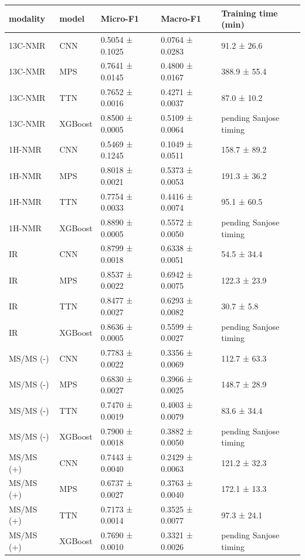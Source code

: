 \begin{tabular}{lllll}
\toprule
modality & model & Micro-F1 & Macro-F1 & Training time (min) \\
\midrule
13C-NMR & CNN & 0.5054 ± 0.1025 & 0.0764 ± 0.0283 & 91.2 ± 26.6 \\
13C-NMR & MPS & 0.7641 ± 0.0145 & 0.4800 ± 0.0167 & 388.9 ± 55.4 \\
13C-NMR & TTN & 0.7652 ± 0.0016 & 0.4271 ± 0.0037 & 87.0 ± 10.2 \\
13C-NMR & XGBoost & 0.8500 ± 0.0005 & 0.5109 ± 0.0064 & pending Sanjose timing \\
1H-NMR & CNN & 0.5469 ± 0.1245 & 0.1049 ± 0.0511 & 158.7 ± 89.2 \\
1H-NMR & MPS & 0.8018 ± 0.0021 & 0.5373 ± 0.0053 & 191.3 ± 36.2 \\
1H-NMR & TTN & 0.7754 ± 0.0033 & 0.4416 ± 0.0074 & 95.1 ± 60.5 \\
1H-NMR & XGBoost & 0.8890 ± 0.0005 & 0.5572 ± 0.0050 & pending Sanjose timing \\
IR & CNN & 0.8799 ± 0.0018 & 0.6338 ± 0.0051 & 54.5 ± 34.4 \\
IR & MPS & 0.8537 ± 0.0022 & 0.6942 ± 0.0075 & 122.3 ± 23.9 \\
IR & TTN & 0.8477 ± 0.0027 & 0.6293 ± 0.0082 & 30.7 ± 5.8 \\
IR & XGBoost & 0.8636 ± 0.0005 & 0.5599 ± 0.0027 & pending Sanjose timing \\
MS/MS (-) & CNN & 0.7783 ± 0.0022 & 0.3356 ± 0.0069 & 112.7 ± 63.3 \\
MS/MS (-) & MPS & 0.6830 ± 0.0027 & 0.3966 ± 0.0025 & 148.7 ± 28.9 \\
MS/MS (-) & TTN & 0.7470 ± 0.0019 & 0.4003 ± 0.0079 & 83.6 ± 34.4 \\
MS/MS (-) & XGBoost & 0.7900 ± 0.0018 & 0.3882 ± 0.0050 & pending Sanjose timing \\
MS/MS (+) & CNN & 0.7443 ± 0.0040 & 0.2429 ± 0.0063 & 121.2 ± 32.3 \\
MS/MS (+) & MPS & 0.6737 ± 0.0027 & 0.3763 ± 0.0040 & 172.1 ± 13.3 \\
MS/MS (+) & TTN & 0.7173 ± 0.0014 & 0.3525 ± 0.0077 & 97.3 ± 24.1 \\
MS/MS (+) & XGBoost & 0.7690 ± 0.0010 & 0.3321 ± 0.0026 & pending Sanjose timing \\
\bottomrule
\end{tabular}

